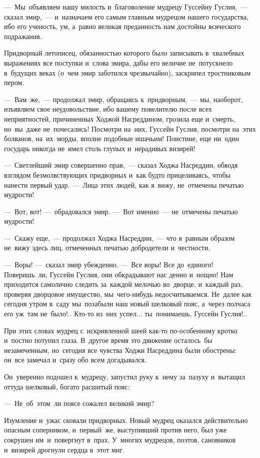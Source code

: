 \documentclass[12pt,a4paper]{book}
\begin{document}
—~Мы~объявляем нашу милость и~благоволение мудрецу Гуссейну Гуслия,~— сказал эмир,~— и~назначаем его самым главным мудрецом нашего государства, ибо его ученость, ум, а~равно великая преданность нам достойны всяческого подражания.

Придворный летописец, обязанностью которого было записывать в~хвалебных выражениях все поступки и~слова эмира, дабы его величие не~потускнело в~будущих веках (о~чем эмир заботился чрезвычайно), заскрипел тростниковым пером.

—~Вам~же,~— продолжал эмир, обращаясь к~придворным,~— мы, наоборот, изъявляем свое неудовольствие, ибо вашему повелителю после всех неприятностей, причиненных Ходжой Насреддином, грозила еще и~смерть, но~вы~даже не~почесались! Посмотри на~них, Гуссейн Гуслия, посмотри на~этих болванов, на~их~морды, вполне подобные ишачьим! Поистине, еще ни~один государь никогда не~имел столь глупых и~нерадивых визирей!

—~Светлейший эмир совершенно прав,~— сказал Ходжа Насреддин, обводя взглядом безмолвствующих придворных и~как будто прицеливаясь, чтобы нанести первый удар. —~Лица этих людей, как я~вижу, не~отмечены печатью мудрости!

—~Вот, вот! —~обрадовался эмир. —~Вот именно~— не~отмечены печатью мудрости!

—~Скажу еще,~— продолжал Ходжа Насреддин,~— что я~равным образом не~вижу здесь лиц, отмеченных печатью добродетели и~честности.

—~Воры! —~сказал эмир убежденно. —~Все воры! Все до~единого! Поверишь~ли, Гуссейн Гуслия, они обкрадывают нас денно и~нощно! Нам приходится самолично следить за~каждой мелочью во~дворце, и~каждый раз, проверяя дворцовое имущество, мы~чего-нибудь недосчитываемся. Не~далее как сегодня утром в~саду мы~позабыли наш новый шелковый пояс, а~через полчаса его уж~там не~было!.. Кто-то из~них успел... ты~понимаешь, Гуссейн Гуслия!..

При этих словах мудрец с~искривленной шеей как-то по-особенному кротко и~постно потупил глаза. В~другое время это движение осталось~бы незамеченным, но~сегодня все чувства Ходжи Насреддина были обострены: он~все замечал и~сразу обо всем догадывался.

Он~уверенно подошел к~мудрецу, запустил руку к~нему за~пазуху и~вытащил оттуда шелковый, богато расшитый пояс:

—~Не~об~этом~ли поясе сожалел великий эмир?

Изумление и~ужас сковали придворных. Новый мудрец оказался действительно опасным соперником, и~первый~же, выступивший против него, был уже сокрушен им~и~повергнут в~прах. У~многих мудрецов, поэтов, сановников и~визирей дрогнули сердца в~этот миг.
\end{document}
